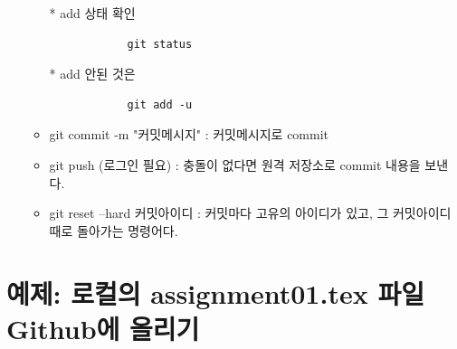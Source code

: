 \documentclass[a4paper]{article}
\begin{document}
\begin{enumerate}
\begin{itemize}
			* add 상태 확인
			
			\begin{verbatim}
			git status
			\end{verbatim}
			
			* add 안된 것은 
			\begin{verbatim}
			git add -u
			\end{verbatim}
			
			
			\item git commit -m "커밋메시지" : 커밋메시지로 commit
			\item git push (로그인 필요) : 충돌이 없다면 원격 저장소로 commit 내용을 보낸다.
			
			\item git reset --hard 커밋아이디 : 커밋마다 고유의 아이디가 있고, 그 커밋아이디 때로 돌아가는 명령어다.
		\end{itemize}
		
		
		
		
	\end{enumerate}
	
	
	\newpage
	\section{예제: 로컬의 assignment01.tex 파일 Github에 올리기}
	
\end{document}
